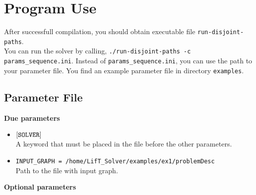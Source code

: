 \documentclass[a4paper,10pt]{article}
\begin{document}
\section{Program Use}\label{sec:programUse}
 

After successfull compilation, you should obtain executable file \texttt{run-disjoint-paths}.\\
You can run the solver by calling, \texttt{./run-disjoint-paths -c params\_sequence.ini}. Instead of \texttt{params\_sequence.ini}, you can use the path to your parameter file. You find an example parameter file in directory \texttt{examples}.


\subsection{Parameter File}
\textbf{Due parameters}
\begin{itemize}
 \item  $[\text{\texttt{SOLVER}}]$\\
 A keyword that must be placed in the file before the other parameters.
 \item  \texttt{INPUT\_GRAPH = /home/LifT\_Solver/examples/ex1/problemDesc} \\
 Path to the file with input graph.
 

 

 \end{itemize}
 \textbf{Optional parameters}
\end{document}
